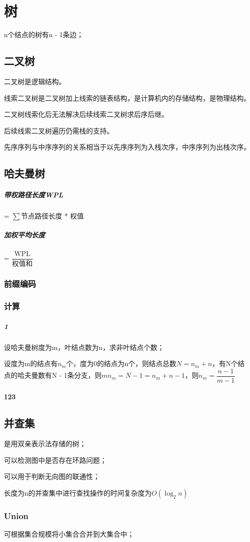 
\chapter{树}
n个结点的树有n - 1条边；


\section{二叉树}

二叉树是逻辑结构。

线索二叉树是二叉树加上线索的链表结构，是计算机内的存储结构，是物理结构。

二叉树线索化后无法解决后续线索二叉树求后序后继。

后续线索二叉树遍历仍需栈的支持。


先序序列与中序序列的关系相当于以先序序列为入栈次序，中序序列为出栈次序。


\section{哈夫曼树}

\paragraph{带权路径长度WPL}
 = \(\sum\)节点路径长度 * 权值

\paragraph{加权平均长度}
 = \(\dfrac{\text{WPL}}{\text{权值和}}\)

\subsection{前缀编码}

\subsection{计算}

\paragraph{1}
设哈夫曼树度为m，叶结点数为n，求非叶结点个数；

设度为m的结点有\(n_m\)个，度为0的结点为n个，则结点总数\(N = n_m + n\)，有N个结点的哈夫曼数有N - 1条分支，则\(mn_m = N - 1 = n_m + n - 1\)，则\(n_m = \dfrac{n - 1}{m - 1}\)


\subsubsection{123}


\section{并查集}

是用双亲表示法存储的树；

可以检测图中是否存在环路问题；

可以用于判断无向图的联通性；

长度为n的并查集中进行查找操作的时间复杂度为\(O(\log_2n)\)

\subsection{Union}

可根据集合规模将小集合合并到大集合中；


